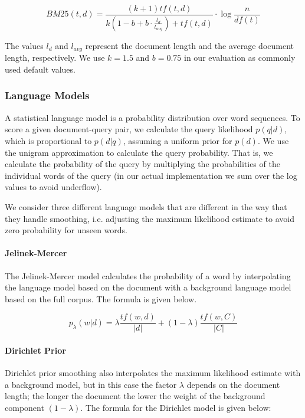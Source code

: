 \begin{equation*}
BM25(t,d) = \frac{(k + 1) tf(t,d)}{k(1 - b + b \cdot \frac{l_d}{l_{avg}} ) + tf(t,d)} \cdot \log\frac{n}{df(t)} 
\end{equation*}

The values $l_d$ and $l_{avg}$ represent the document length and the average
document length, respectively.
We use $k = 1.5$ and $b = 0.75$ in our evaluation as commonly used default values.
 
\subsubsection{Language Models}

A statistical language model is a probability distribution over word sequences.
To score a given document-query pair, we calculate the query likelihood
$p(q|d)$, which is proportional to $p(d|q)$, 
assuming a uniform prior for $p(d)$.
We use the unigram approximation to calculate the query probability.
That is, we calculate the probability of the query by
multiplying the probabilities of the individual words of the query
(in our actual implementation we sum over the log values to avoid underflow).

We consider three different language models that are different in the way that
they handle smoothing, i.e. adjusting the maximum likelihood estimate to avoid 
zero probability for unseen words.

\paragraph{Jelinek-Mercer}

The Jelinek-Mercer model calculates the probability of a word by
interpolating the language model based on the document with
a background language model based on the full corpus.
The formula is given below.

\begin{equation*}
p_{\lambda}(w | d) = \lambda \frac{tf(w,d)}{|d|} + (1 - \lambda) \frac{tf(w,C)}{|C|}
\end{equation*}


\paragraph{Dirichlet Prior}

Dirichlet prior smoothing also interpolates the maximum 
likelihood estimate with a background model,
but in this case the factor $\lambda$ depends on the document length;
the longer the document the lower the weight of the background component $(1-\lambda)$.
The formula for the Dirichlet model is given below:

